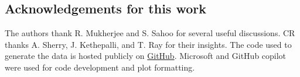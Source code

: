 \documentclass[../Rajarshi-thesis-draft.tex]{subfiles}
\begin{document}


\subsection*{Acknowledgements for this work}
The authors thank R. Mukherjee and S. Sahoo for several useful discussions. CR thanks A. Sherry, J. Kethepalli, and T. Ray for their insights. The code used to generate the data is hosted publicly on \href{https://github.com/Rajarshi-prime/GT-Euler}{GitHub}. Microsoft and GitHub copilot were used for code development and plot formatting.
\end{document}
